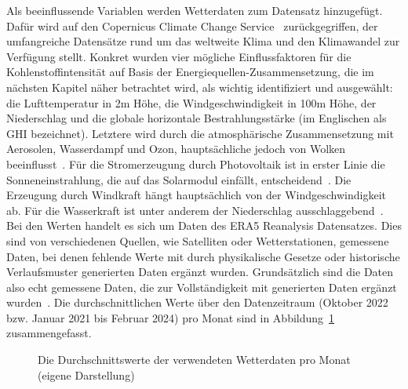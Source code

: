 Als beeinflussende Variablen werden Wetterdaten zum Datensatz hinzugefügt.
Dafür wird auf den Copernicus Climate Change Service~\cite{Copernicus.20231212T14:09:40.000Z} zurückgegriffen, der umfangreiche Datensätze rund um das weltweite Klima und den Klimawandel zur Verfügung stellt.
Konkret wurden vier mögliche Einflussfaktoren für die Kohlenstoffintensität auf Basis der Energiequellen-Zusammensetzung, die im nächsten Kapitel näher betrachtet wird, als wichtig identifiziert und ausgewählt:
die Lufttemperatur in 2m Höhe, die Windgeschwindigkeit in 100m Höhe, der Niederschlag und die globale horizontale Bestrahlungsstärke (im Englischen als \ac{GHI} bezeichnet).
Letztere wird durch die atmosphärische Zusammensetzung mit Aerosolen, Wasserdampf und Ozon, hauptsächliche jedoch von Wolken beeinflusst~\cite{KallioMyers.2020}.
Für die Stromerzeugung durch Photovoltaik ist in erster Linie die Sonneneinstrahlung, die auf das Solarmodul einfällt, entscheidend~\cite{James.}.
Die Erzeugung durch Windkraft hängt hauptsächlich von der Windgeschwindigkeit ab.
Für die Wasserkraft ist unter anderem der Niederschlag ausschlaggebend~\cite{Copernicus.20231212T14:09:40.000Z}.
Bei den Werten handelt es sich um Daten des ERA5 Reanalysis Datensatzes.
Dies sind von verschiedenen Quellen, wie Satelliten oder Wetterstationen, gemessene Daten, bei denen fehlende Werte mit durch physikalische Gesetze oder historische Verlaufsmuster generierten Daten ergänzt wurden.
Grundsätzlich sind die Daten also echt gemessene Daten, die zur Vollständigkeit mit generierten Daten ergänzt wurden~\cite{CopernicusClimateChangeService.2020}\cite{CopernicusKnowledgeBase.20231009}.
Die durchschnittlichen Werte über den Datenzeitraum (Oktober 2022 bzw. Januar 2021 bis Februar 2024) pro Monat sind in Abbildung~\ref{FIG:weather-data-by-month} zusammengefasst.
\begin{figure}[ht]
 \centering
 \par\medskip
 \caption[Durchschnittswerte der Wetterdaten]{Die Durchschnittswerte der verwendeten Wetterdaten pro Monat (eigene Darstellung)}%
 \label{FIG:weather-data-by-month}%
\end{figure}
